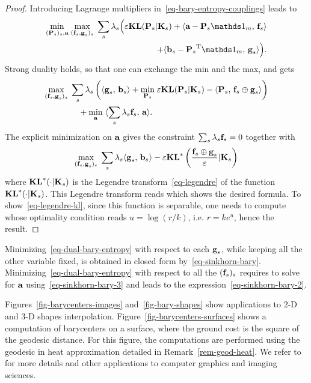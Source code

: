 \begin{proof}
	Introducing Lagrange multipliers in~\eqref{eq-bary-entropy-couplings} leads to
	\begin{align*}
		\umin{ (\P_s)_s, \a } 
		\umax{ ( \fD_s,\gD_s )_s }
		\sum_{s} \la_s \Big(
			\epsilon \KLD( \P_s|\K_s )
			+ 
			\dotp{\a - \P_s\ones_m}{ \fD_s } \\
		\qquad\qquad	+			
			\dotp{\b_s - \transp{\P_s}\ones_m}{ \gD_s }
		\Big).
	\end{align*}
	Strong duality holds, so that one can exchange the min and the max, and gets
		\begin{align*}
		&\underset{ ( \mathrm{\textbf{\upshape f}}_s,\mathrm{\textbf{\upshape g}}_s )_s }{\max}\;
			\sum_s \lambda_s \left( 
				 \langle \mathrm{\textbf{\upshape g}}_s,\,\mathrm{\textbf{\upshape b}}_s\rangle
		+ 
		\underset{\mathrm{\textbf{\upshape P}}_s}{\min}\; \varepsilon \mathrm{\textbf{\upshape KL}}( \mathrm{\textbf{\upshape P}}_s|\mathrm{\textbf{\upshape K}}_s ) - \langle \mathrm{\textbf{\upshape P}}_s,\,\mathrm{\textbf{\upshape f}}_s \oplus \mathrm{\textbf{\upshape g}}_s \rangle
		 \right) \\
	&\qquad\qquad	+ \underset{\mathrm{\textbf{\upshape a}}}{\min}\;
			\langle  \sum_{s} \lambda_s \mathrm{\textbf{\upshape f}}_s ,\,\mathrm{\textbf{\upshape a}}\rangle.
	\end{align*}
	The explicit minimization on $\mathrm{\textbf{\upshape a}}$ gives the constraint $\sum_{s} \lambda_s \mathrm{\textbf{\upshape f}}_s=0$ together with 
	\begin{align*}
		\underset{ ( \mathrm{\textbf{\upshape f}}_s,\mathrm{\textbf{\upshape g}}_s )_s }{\max}\;
			\sum_s \lambda_s 
				 \langle \mathrm{\textbf{\upshape g}}_s,\,\mathrm{\textbf{\upshape b}}_s\rangle
		-
		\varepsilon \mathrm{\textbf{\upshape KL}}^*\left(  \frac{\mathrm{\textbf{\upshape f}}_s \oplus \mathrm{\textbf{\upshape g}}_s}{\varepsilon}|\mathrm{\textbf{\upshape K}}_s  \right)
	\end{align*}
	where $\mathrm{\textbf{\upshape KL}}^*(\cdot|\mathrm{\textbf{\upshape K}}_s)$ is the Legendre transform~\eqref{eq-legendre} of the function $\mathrm{\textbf{\upshape KL}}^*(\cdot|\mathrm{\textbf{\upshape K}}_s)$.
	This Legendre transform reads
	which shows the desired formula. 
	To show~\eqref{eq-legendre-kl}, since this function is separable, one needs to compute
	whose optimality condition reads $u=\log(r/k)$, i.e. $r = k e^{u}$, hence the result.
\end{proof}

Minimizing~\eqref{eq-dual-bary-entropy} with respect to each $\mathrm{\textbf{\upshape g}}_s$, while keeping all the other variable fixed, is obtained in closed form by~\eqref{eq-sinkhorn-bary}. 
%
Minimizing~\eqref{eq-dual-bary-entropy} with respect to all the $(\mathrm{\textbf{\upshape f}}_s)_s$ requires to solve for $\mathrm{\textbf{\upshape a}}$ using~\eqref{eq-sinkhorn-bary-3} and leads to the expression~\eqref{eq-sinkhorn-bary-2}.

Figures~\ref{fig-barycenters-images} and~\ref{fig-bary-shapes} show applications to 2-D and 3-D shapes interpolation. Figure~\ref{fig-barycenters-surfaces} shows a computation of barycenters on a surface, where the ground cost is the square of the geodesic distance. For this figure, the computations are performed using the geodesic in heat approximation detailed in Remark~\ref{rem-geod-heat}. We refer to~\cite{2015-solomon-siggraph} for more details and other applications to computer graphics and imaging sciences.
